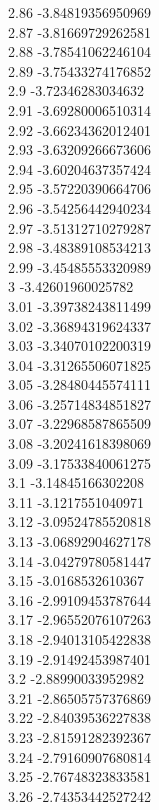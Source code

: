 {2.86	-3.84819356950969\\
2.87	-3.81669729262581\\
2.88	-3.78541062246104\\
2.89	-3.75433274176852\\
2.9	-3.72346283034632\\
2.91	-3.69280006510314\\
2.92	-3.66234362012401\\
2.93	-3.63209266673606\\
2.94	-3.60204637357424\\
2.95	-3.57220390664706\\
2.96	-3.54256442940234\\
2.97	-3.51312710279287\\
2.98	-3.48389108534213\\
2.99	-3.45485553320989\\
3	-3.42601960025782\\
3.01	-3.39738243811499\\
3.02	-3.36894319624337\\
3.03	-3.34070102200319\\
3.04	-3.31265506071825\\
3.05	-3.28480445574111\\
3.06	-3.25714834851827\\
3.07	-3.22968587865509\\
3.08	-3.20241618398069\\
3.09	-3.17533840061275\\
3.1	-3.14845166302208\\
3.11	-3.1217551040971\\
3.12	-3.09524785520818\\
3.13	-3.06892904627178\\
3.14	-3.04279780581447\\
3.15	-3.0168532610367\\
3.16	-2.99109453787644\\
3.17	-2.96552076107263\\
3.18	-2.94013105422838\\
3.19	-2.91492453987401\\
3.2	-2.88990033952982\\
3.21	-2.86505757376869\\
3.22	-2.84039536227838\\
3.23	-2.81591282392367\\
3.24	-2.79160907680814\\
3.25	-2.76748323833581\\
3.26	-2.74353442527242\\
}
